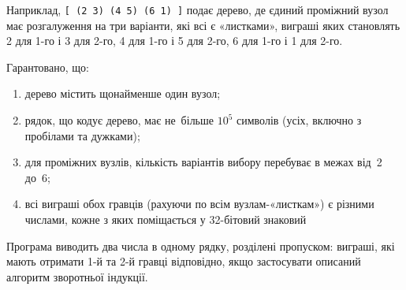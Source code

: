 Наприклад, \texttt{[ (2 3) (4 5) (6 1) ]} подає дерево, де єдиний проміжний вузол має розгалуження на три варіанти, які всі є «листками», виграші яких становлять 
2 для 1-го і 3 для 2-го,
4 для 1-го і 5 для 2-го,
6 для 1-го і 1 для 2-го.


Гарантовано, що:
\begin{enumerate}
\item
дерево містить щонайменше один вузол;
\item
рядок, що кодує дерево, має не~більше $10^5$ символів (усіх, включно з пробілами та дужками);
\item
для проміжних вузлів, кількість варіантів вибору перебуває в межах від~2 до~6;
\item
всі виграші обох гравців (рахуючи по всім вузлам-«листкам») є різними числами, кожне з яких поміщається у 32-бітовий знаковий \end{enumerate}

\OutputFile
Програма виводить два числа в одному рядку, розділені пропуском: виграші, які мають отримати 1-й та 2-й гравці відповідно, якщо застосувати описаний алгоритм зворотньої індукції.

\Example

\begin{scriptsize}
\begin{examplewide}
\end{examplewide}
\end{scriptsize}



